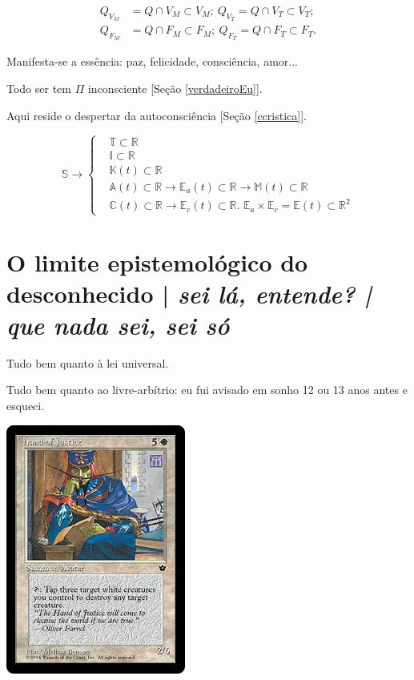 \documentclass[12pt,a4paper]{article}
\begin{document}
			\begin{align*}
				Q_{V_M} &= Q \cap V_M \subset V_M; \
				Q_{V_T} = Q \cap V_T \subset V_T; \\
				Q_{F_M} &= Q \cap F_M \subset F_M; \
				Q_{F_T} = Q \cap F_T \subset F_T.
			\end{align*}

			Manifesta-se a ess\^encia: paz, felicidade, consci\^encia, amor...

			Todo ser tem $\Pi$ inconsciente [Se\c{c}\~ao \ref{verdadeiroEu}].

			Aqui reside o despertar da autoconsci\^encia [Se\c{c}\~ao \ref{ccristica}].

\begin{equation*}
	\mathbb{S} \rightarrow
	\left\{\begin{aligned}
	    &\mathbb{T} \subset \mathbb{R} \\
	    &\mathbb{I} \subset \mathbb{R} \\
	    &\mathbb{K}(t) \subset \mathbb{R} \\
		&\mathbb{A}(t) \subset \mathbb{R} \rightarrow \mathbb{E}_a(t) \subset \mathbb{R} \rightarrow \mathbb{M}(t) \subset \mathbb{R} \\
		&\mathbb{C}(t) \subset \mathbb{R} \rightarrow \mathbb{E}_c(t) \subset \mathbb{R}. \,\, \mathbb{E}_a \times \mathbb{E}_c = \mathbb{E}(t) \subset \mathbb{R}^2
	\end{aligned}
	\right.
\end{equation*}

	\section {O limite epistemol\'ogico do desconhecido | \emph{ sei l\'a, entende? | que nada sei, sei s\'o}}\label{epistemologia}
		\begin{flushright}
		\end{flushright}

		Tudo bem quanto \`a lei universal.

		Tudo bem quanto ao livre-arb\'itrio: eu fui avisado em sonho\cite{x} 12 ou 13 anos antes e esqueci.

		\begin{center}
		\includegraphics{hand}
		\end{center}
\end{document}
